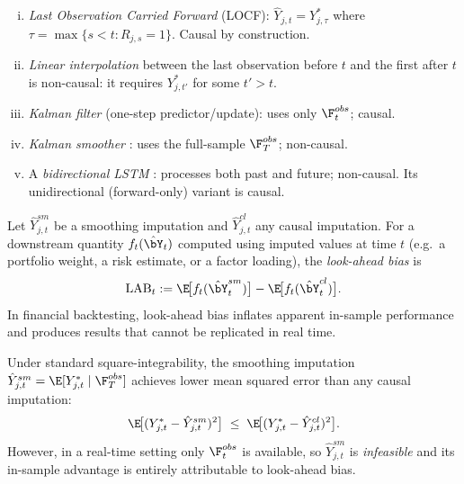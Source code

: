 \begin{example}
\label{ex:causal_smoothing}
\begin{enumerate}[(i)]
  \item \emph{Last Observation Carried Forward} (LOCF):
        $\hat{Y}_{j,t}=Y_{j,\tau}^*$ where
        $\tau=\max\{s<t:R_{j,s}=1\}$.  Causal by construction.
  \item \emph{Linear interpolation} between the last observation before $t$
        and the first after $t$ is non-causal: it requires
        $Y_{j,t'}^*$ for some $t'>t$.
  \item \emph{Kalman filter} (one-step predictor/update):
        uses only $\F_t^{obs}$; causal.
  \item \emph{Kalman smoother}
        \citep[Ch.~4]{durbin2012}: uses the full-sample
        $\F_T^{obs}$; non-causal.
  \item A \emph{bidirectional LSTM}
        \citep{cao2018}: processes both past and future;
        non-causal.  Its unidirectional (forward-only) variant is causal.
\end{enumerate}
\end{example}

\begin{definition}
\label{def:look_ahead_bias}
Let $\hat{Y}_{j,t}^{sm}$ be a smoothing imputation and
$\hat{Y}_{j,t}^{cl}$ any causal imputation.  For a downstream quantity
$f_t(\hat{\bY}_t)$ computed using imputed values at time $t$
(e.g.\ a portfolio weight, a risk estimate, or a factor loading), the
\emph{look-ahead bias} is
\[
  \mathrm{LAB}_t
  := \E\!\bigl[f_t(\hat{\bY}_t^{sm})\bigr]
   - \E\!\bigl[f_t(\hat{\bY}_t^{cl})\bigr].
\]
In financial backtesting, look-ahead bias inflates apparent in-sample
performance and produces results that cannot be replicated in real time.
\end{definition}

\begin{proposition}
\label{prop:smoothing_vs_causal}
Under standard square-integrability, the smoothing imputation
$\hat{Y}_{j,t}^{sm}=\E[Y_{j,t}^*\mid\F_T^{obs}]$ achieves lower
mean squared error than any causal imputation:
\[
  \E\!\bigl[(Y_{j,t}^*-\hat{Y}_{j,t}^{sm})^2\bigr]
  \;\le\;
  \E\!\bigl[(Y_{j,t}^*-\hat{Y}_{j,t}^{cl})^2\bigr].
\]
However, in a real-time setting only $\F_t^{obs}$ is available, so
$\hat{Y}_{j,t}^{sm}$ is \emph{infeasible} and its in-sample advantage is
entirely attributable to look-ahead bias.
\end{proposition}


